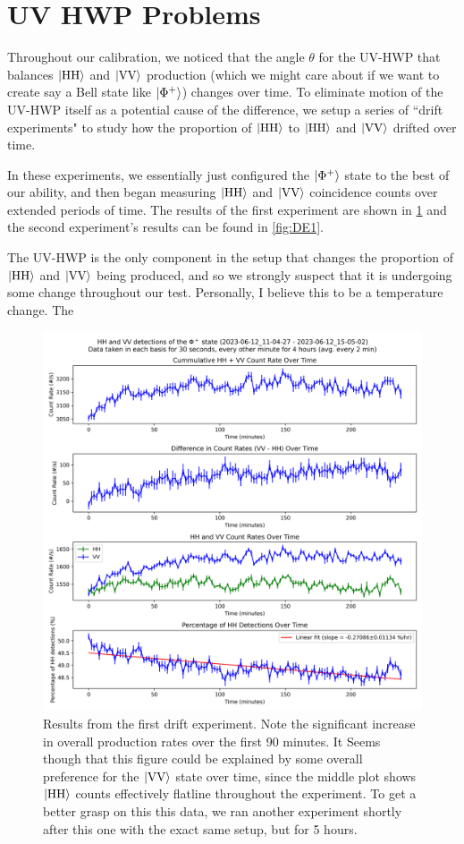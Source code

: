 \section{UV HWP Problems}
	
Throughout our calibration, we noticed that the angle $\theta$ for the UV-HWP that balances $\ket{\text{HH}}$ and $\ket{\text{VV}}$ production (which we might care about if we want to create say a Bell state like $\ket{\Phi^+}$) changes over time. To eliminate motion of the UV-HWP itself as a potential cause of the difference, we setup a series of ``drift experiments" to study how the proportion of $\ket{\text{HH}}$ to $\ket{\text{HH}}$ and $\ket{\text{VV}}$ drifted over time.

In these experiments, we essentially just configured the $\ket{\Phi^+}$ state to the best of our ability, and then began measuring $\ket{\text{HH}}$ and $\ket{\text{VV}}$ coincidence counts over extended periods of time. The results of the first experiment are shown in \cref{fig:DE0} and the second experiment's results can be found in \cref{fig:DE1}.

The UV-HWP is the only component in the setup that changes the proportion of $\ket{\text{HH}}$ and $\ket{\text{VV}}$ being produced, and so we strongly suspect that it is undergoing some change throughout our test. Personally, I believe this to be a temperature change. The 

\begin{figure}
	\centering
	\includegraphics[width=\textwidth]{DE0_plot.png}	
	\caption{Results from the first drift experiment. Note the significant increase in overall production rates over the first 90 minutes. It Seems though that this figure could be explained by some overall preference for the $\ket{\text{VV}}$ state over time, since the middle plot shows $\ket{\text{HH}}$ counts effectively flatline throughout the experiment. To get a better grasp on this this data, we ran another experiment shortly after this one with the exact same setup, but for 5 hours.}
	\label{fig:DE0}
\end{figure}

